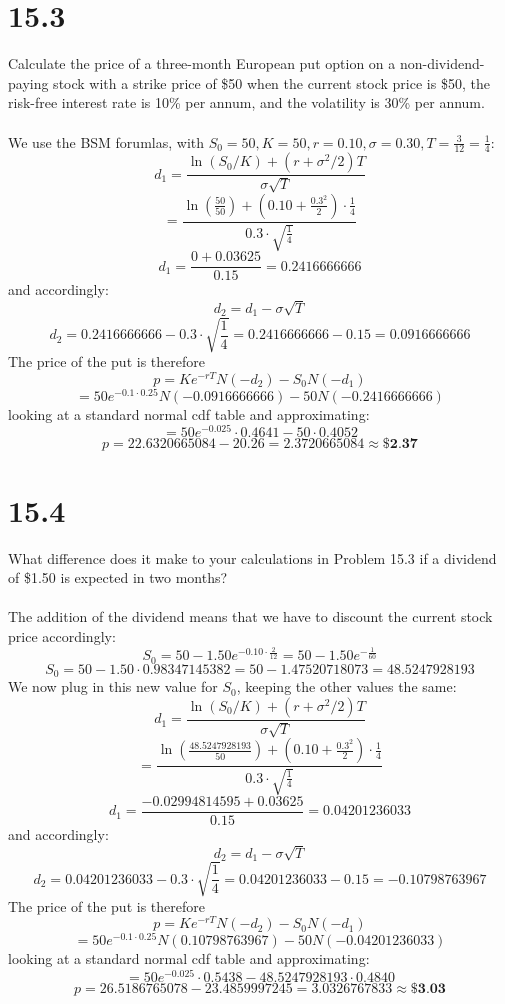 \documentclass{article}
\begin{document}
\thispagestyle{firstpageheader}
{\Large 

\section*{15.3}
Calculate the price of a three-month European put option on a non-dividend-paying stock with a strike price of \$50 when the current stock price is \$50, the risk-free interest rate is 10\% per annum, and the volatility is 30\% per annum. \\ \\
We use the BSM forumlas, with \(S_0 = 50, K = 50, r = 0.10, \sigma = 0.30, T = \frac{3}{12} = \frac{1}{4}\):
\[
  d_1 = \frac{\ln(S_0 / K) + (r + \sigma^2 / 2)T}{\sigma \sqrt{T}}
\]
\[
  = \frac{\ln(\frac{50}{50}) + (0.10 + \frac{0.3^2}{2}) \cdot \frac{1}{4}}{0.3 \cdot \sqrt{\frac{1}{4}}}
\]
\[
  d_1 = \frac{0 + 0.03625}{0.15} = 0.2416666666
\]
and accordingly:
\[
  d_2 = d_1 - \sigma \sqrt{T}
\]
\[
  d_2 = 0.2416666666 - 0.3 \cdot \sqrt{\frac{1}{4}} = 0.2416666666 - 0.15 = 0.0916666666
\]
The price of the put is therefore
\[
  p = Ke^{-rT} N(-d_2) - S_0 N(-d_1)
\]
\[
  = 50 e^{-0.1 \cdot 0.25} N(-0.0916666666) - 50  N(-0.2416666666)
\]
looking at a standard normal cdf table and approximating: 
\[
  = 50 e^{-0.025} \cdot 0.4641 - 50 \cdot 0.4052
\]
\[
  p = 22.6320665084 - 20.26 = 2.3720665084 \approx \boxed{\textbf{\$2.37}}
\]

}
{\Large 

\section*{15.4}
What difference does it make to your calculations in Problem 15.3 if a dividend of \$1.50 is expected in two months? \\ \\
The addition of the dividend means that we have to discount the current stock price accordingly:
\[
  S_0 = 50 - 1.50e^{-0.10 \cdot \frac{2}{12}} = 50 - 1.50 e^{-\frac{1}{60}}
\]
\[
  S_0 = 50 - 1.50 \cdot 0.98347145382 = 50 - 1.47520718073 = 48.5247928193
\]
We now plug in this new value for \(S_0\), keeping the other values the same:
\[
  d_1 = \frac{\ln(S_0 / K) + (r + \sigma^2 / 2)T}{\sigma \sqrt{T}}
\]
\[
  = \frac{\ln(\frac{48.5247928193}{50}) + (0.10 + \frac{0.3^2}{2}) \cdot \frac{1}{4}}{0.3 \cdot \sqrt{\frac{1}{4}}}
\]
\[
  d_1 = \frac{-0.02994814595 + 0.03625}{0.15} = 0.04201236033
\]
and accordingly:
\[
  d_2 = d_1 - \sigma \sqrt{T}
\]
\[
  d_2 = 0.04201236033 - 0.3 \cdot \sqrt{\frac{1}{4}} = 0.04201236033 - 0.15 = -0.10798763967
\]
The price of the put is therefore
\[
  p = Ke^{-rT} N(-d_2) - S_0 N(-d_1)
\]
\[
  = 50 e^{-0.1 \cdot 0.25} N(0.10798763967) - 50  N(-0.04201236033)
\]
looking at a standard normal cdf table and approximating: 
\[
  = 50 e^{-0.025} \cdot 0.5438 - 48.5247928193 \cdot 0.4840
\]
\[
  p = 26.5186765078 - 23.4859997245 = 3.0326767833 \approx \boxed{\textbf{\$3.03}}
\]



}
\end{document}
